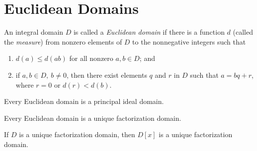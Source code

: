\section{Euclidean Domains}

\begin{definition}
	An integral domain $D$ is called a \textit{Euclidean domain} if there is a function $d$ (called the \textit{measure}) from nonzero elements of $D$ to the nonnegative integers such that
	\begin{enumerate}
		\item $d(a) \leq d(ab)$ for all nonzero $a,b \in D$; and
		\item if $a,b \in D,\ b \neq 0$, then there exist elements $q$ and $r$ in $D$ such that $a = bq + r$, where $r = 0$ or $d(r) < d(b)$.
	\end{enumerate}
\end{definition}

\begin{theorem}
	Every Euclidean domain is a principal ideal domain.
\end{theorem}

\begin{corollary}
	Every Euclidean domain is a unique factorization domain.
\end{corollary}

\begin{theorem}
	If $D$ is a unique factorization domain, then $D[x]$ is a unique factorization domain.
\end{theorem}
